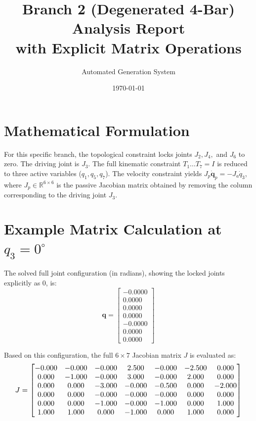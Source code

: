 \documentclass[12pt,a4paper]{article}
\title{\textbf{Branch 2 (Degenerated 4-Bar) Analysis Report \\ with Explicit Matrix Operations}}
\author{Automated Generation System}
\date{\today}
\begin{document}
\maketitle

\section{Mathematical Formulation}
For this specific branch, the topological constraint locks joints $J_2, J_4,$ and $J_6$ to zero. The driving joint is $J_3$. The full kinematic constraint $T_1 \dots T_7 = I$ is reduced to three active variables ($q_1, q_5, q_7$).
The velocity constraint yields $J_p \dot{\mathbf{q}}_p = - J_a \dot{q}_3$, where $J_p \in \mathbb{R}^{6 \times 6}$ is the passive Jacobian matrix obtained by removing the column corresponding to the driving joint $J_3$.

\section{Example Matrix Calculation at $q_3 = 0^\circ$}
The solved full joint configuration (in radians), showing the locked joints explicitly as $0$, is:
\begin{equation}
    \mathbf{q} = \begin{bmatrix} -0.0000 \\ 0.0000 \\ 0.0000 \\ 0.0000 \\ -0.0000 \\ 0.0000 \\ 0.0000 \end{bmatrix}
\end{equation}

Based on this configuration, the full $6 \times 7$ Jacobian matrix $J$ is evaluated as:
\begin{equation}
    \resizebox{0.95\textwidth}{!}{$ J = \begin{bmatrix}
  -0.000 & -0.000 & -0.000 & 2.500 & -0.000 & -2.500 & 0.000 \\
  0.000 & -1.000 & -0.000 & 3.000 & -0.000 & 2.000 & 0.000 \\
  0.000 & 0.000 & -3.000 & -0.000 & -0.500 & 0.000 & -2.000 \\
  0.000 & 0.000 & -0.000 & -0.000 & -0.000 & 0.000 & 0.000 \\
  0.000 & 0.000 & -1.000 & -0.000 & -1.000 & 0.000 & 1.000 \\
  1.000 & 1.000 & 0.000 & -1.000 & 0.000 & 1.000 & 0.000
\end{bmatrix} $}
\end{equation}
\end{document}
